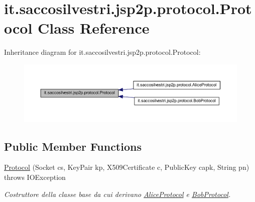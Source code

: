\hypertarget{classit_1_1saccosilvestri_1_1jsp2p_1_1protocol_1_1_protocol}{
\section{it.saccosilvestri.jsp2p.protocol.\-Protocol \-Class \-Reference}
\label{classit_1_1saccosilvestri_1_1jsp2p_1_1protocol_1_1_protocol}
}


\-Inheritance diagram for it.saccosilvestri.jsp2p.protocol.\-Protocol\-:
\nopagebreak
\begin{figure}[H]
\begin{center}
\leavevmode
\includegraphics[width=350pt]{classit_1_1saccosilvestri_1_1jsp2p_1_1protocol_1_1_protocol__inherit__graph}
\end{center}
\end{figure}
\subsection*{\-Public \-Member \-Functions}
\begin{DoxyCompactItemize}
\item 
\hyperlink{classit_1_1saccosilvestri_1_1jsp2p_1_1protocol_1_1_protocol_a41b3f8af2182ce1d95ac4622c689110c}{\-Protocol} (\-Socket cs, \-Key\-Pair kp, \-X509\-Certificate c, \-Public\-Key capk, \-String pn)  throws I\-O\-Exception 
\begin{DoxyCompactList}\small\item\em \-Costruttore della classe base da cui derivano \hyperlink{classit_1_1saccosilvestri_1_1jsp2p_1_1protocol_1_1_alice_protocol}{\-Alice\-Protocol} e \hyperlink{classit_1_1saccosilvestri_1_1jsp2p_1_1protocol_1_1_bob_protocol}{\-Bob\-Protocol}. \end{DoxyCompactList}\end{DoxyCompactItemize}
